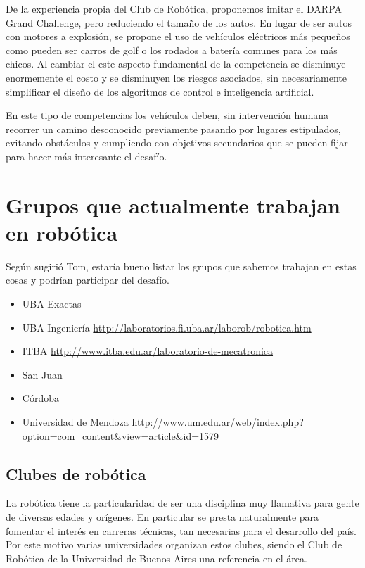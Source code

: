 \documentclass[a4paper,12pt]{article}
\begin{document}
De la experiencia propia del Club de Robótica\cite{club}, proponemos imitar el DARPA Grand Challenge, pero reduciendo el tamaño de los autos. En lugar de ser autos con motores a explosión, se propone el uso de vehículos eléctricos más pequeños como pueden ser carros de golf o los rodados a batería comunes para los más chicos. Al cambiar el este aspecto fundamental de la competencia se disminuye enormemente el costo y se disminuyen los riesgos asociados, sin necesariamente simplificar el diseño de los algoritmos de control e inteligencia artificial.

En este tipo de competencias los vehículos deben, sin intervención humana recorrer un camino desconocido previamente pasando por lugares estipulados, evitando obstáculos y cumpliendo con objetivos secundarios que se pueden fijar para hacer más interesante el desafío.

\section{Grupos que actualmente trabajan en robótica}
\label{sec:grupos}

Según sugirió Tom, estaría bueno listar los grupos que sabemos trabajan en estas cosas y podrían participar del desafío.

\begin{itemize}
 \item UBA Exactas
 \item UBA Ingeniería \url{http://laboratorios.fi.uba.ar/laborob/robotica.htm}
 \item ITBA \url{http://www.itba.edu.ar/laboratorio-de-mecatronica}
 \item San Juan 
 \item Córdoba
 \item Universidad de Mendoza \url{http://www.um.edu.ar/web/index.php?option=com_content&view=article&id=1579}
\end{itemize}

\subsection{Clubes de robótica}

La robótica tiene la particularidad de ser una disciplina muy llamativa para gente de diversas edades y orígenes. En particular se presta naturalmente para fomentar el interés en carreras técnicas, tan necesarias para el desarrollo del país. Por este motivo varias universidades organizan estos clubes, siendo el Club de Robótica de la Universidad de Buenos Aires una referencia en el área.
\end{document}

